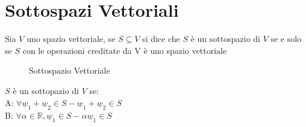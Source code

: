 \chapter{Sottospazi Vettoriali}

Sia $V$ uno spazio vettoriale, se $S\subseteq V$ si dice che $S$ è un sottospazio di $V$ se e solo se $S$ con le operazioni creditate da V è uno spazio vettoriale 
\begin{figure}[H]
	\centering
	\caption[Caption]{Sottospazio Vettoriale}
	\label{fig:sottospaziovettoriale}
\end{figure}

\begin{definizione}
	$S$ è un sottopazio di $V$ se:\\
	A: $\forall \underline{w}_1+\underline{w}_2\in S - \underline{w}_1+\underline{w}_2\in S$\\
	B: $\forall\alpha\in\mathbb{R}, \underline{w}_1\in S - \alpha\underline{w}_1\in S$
\end{definizione}

